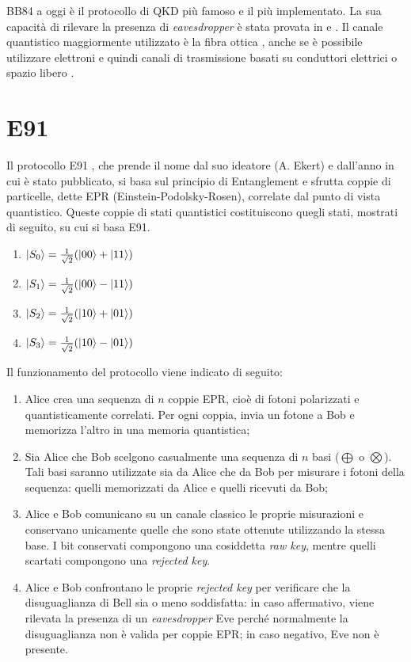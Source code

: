 BB84 a oggi è il protocollo di QKD più famoso e il più implementato. La sua capacità di rilevare la presenza di \textit{eavesdropper} è stata provata in \cite{mayers} e \cite{shor_preskill}. Il canale quantistico maggiormente utilizzato è la fibra ottica \cite{hughes}, anche se è possibile utilizzare elettroni e quindi canali di trasmissione basati su conduttori elettrici o spazio libero \cite{knight}.

\section{E91}
Il protocollo E91 \cite{e91}, che prende il nome dal suo ideatore (A. Ekert) e dall'anno in cui è stato pubblicato, si basa sul principio di Entanglement e sfrutta coppie di particelle, dette EPR (Einstein-Podolsky-Rosen), correlate dal punto di vista quantistico. Queste coppie di stati quantistici costituiscono quegli stati, mostrati di seguito, su cui si basa E91.

\begin{enumerate}
    \item $\ket{S_0} = \frac{1}{\sqrt{2}}(\ket{00}+\ket{11})$
    \item $\ket{S_1} = \frac{1}{\sqrt{2}}(\ket{00}-\ket{11})$
    \item $\ket{S_2} = \frac{1}{\sqrt{2}}(\ket{10}+\ket{01})$
    \item $\ket{S_3} = \frac{1}{\sqrt{2}}(\ket{10}-\ket{01})$
\end{enumerate}

Il funzionamento del protocollo \cite{e91} viene indicato di seguito:
\begin{enumerate}
    \item Alice crea una sequenza di $n$ coppie EPR, cioè di fotoni polarizzati e quantisticamente correlati. Per ogni coppia, invia un fotone a Bob e memorizza l'altro in una memoria quantistica;
    \item Sia Alice che Bob scelgono casualmente una sequenza di $n$ basi  ($\bigoplus$ o $\bigotimes$). Tali basi saranno utilizzate sia da Alice che da Bob per misurare i fotoni della sequenza: quelli memorizzati da Alice e quelli ricevuti da Bob;
    \item Alice e Bob comunicano su un canale classico le proprie misurazioni e conservano unicamente quelle che sono state ottenute utilizzando la stessa base. I bit conservati compongono una cosiddetta \textit{raw key}, mentre quelli scartati compongono una \textit{rejected key}.
    \item Alice e Bob confrontano le proprie \textit{rejected key} per verificare che la disuguaglianza di Bell sia o meno soddisfatta: in caso affermativo, viene rilevata la presenza di un \textit{eavesdropper} Eve perché normalmente la disuguaglianza non è valida per coppie EPR; in caso negativo, Eve non è presente.
\end{enumerate}

